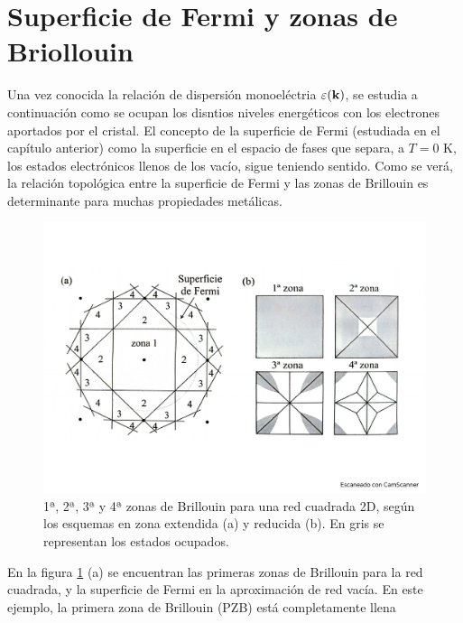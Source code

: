\section{Superficie de Fermi y zonas de Briollouin}

Una vez conocida la relación de dispersión monoeléctria $\varepsilon(\mathbf{k})$, se estudia a continuación como se ocupan los disntios niveles energéticos con los electrones aportados por el cristal. El concepto de la superficie de Fermi (estudiada en el capítulo anterior) como la superficie en el espacio de fases que separa, a $T=0$ K, los estados electrónicos llenos de los vacío, sigue teniendo sentido. Como se verá, la relación topológica entre la superficie de Fermi y las zonas de Brillouin es determinante para muchas propiedades metálicas.

\begin{figure}[h!] \centering
    \includegraphics[scale=0.35]{Cuerpo/Ch_07/Fotos libro 7.pdf}
    \caption{1ª, 2ª, 3ª y 4ª zonas de Brillouin para una red cuadrada 2D, según los esquemas en zona extendida (a) y reducida (b). En gris se representan los estados ocupados.}
    \label{Fig:07-07}
\end{figure}    

En la figura \ref{Fig:07-07} (a) se encuentran las primeras zonas de Brillouin para la red cuadrada, y la superficie de Fermi en la aproximación de red vacía. En este ejemplo, la primera zona de Brillouin (PZB) está completamente llena

